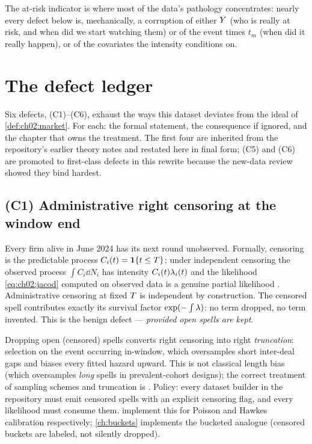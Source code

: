 The at-risk indicator is where most of the data's pathology concentrates:
nearly every defect below is, mechanically, a corruption of either
$Y$ (who is really at risk, and when did we start watching them) or
of the event times $t_m$ (when did it really happen), or of the covariates
the intensity conditions on.

\section{The defect ledger}\label{ch02:sec:defects}

Six defects, (C1)--(C6), exhaust the ways this dataset deviates from the
ideal of \cref{def:ch02:market}. For each: the formal statement, the
consequence if ignored, and the chapter that owns the treatment. The first
four are inherited from the repository's earlier theory notes and restated
here in final form; (C5) and (C6) are promoted to first-class defects in
this rewrite because the new-data review showed they bind hardest.

\subsection*{(C1) Administrative right censoring at the window end}

Every firm alive in June 2024 has its next round unobserved. Formally,
censoring is the predictable process $C_i(t) = \mathbf{1}\{t \le T\}$;
under independent censoring the observed process $\int C_i \dd N_i$ has
intensity $C_i(t)\lambda_i(t)$ and the likelihood \cref{eq:ch02:jacod}
computed on observed data is a genuine partial likelihood
\citep[III.2]{abgk1993}. Administrative censoring at fixed $T$ is
independent by construction. The censored spell contributes exactly its
survival factor $\exp(-\int \lambda)$: no term dropped, no term invented.
This is the benign defect --- \emph{provided open spells are kept}.

\begin{warning}\label{warn:ch02:openspells}
Dropping open (censored) spells converts right censoring into right
\emph{truncation}: selection on the event occurring in-window, which
oversamples short inter-deal gaps and biases every fitted hazard upward.
This is not classical length bias (which oversamples \emph{long} spells in
prevalent-cohort designs); the correct treatment of sampling schemes and
truncation is \citet{kalbfleisch2002}. Policy: every dataset builder in
the repository must emit censored spells with an explicit censoring flag,
and every likelihood must consume them. 
implement this for Poisson and Hawkes calibration respectively;
\cref{ch:buckets} implements the bucketed analogue (censored buckets are
labeled, not silently dropped).
\end{warning}

